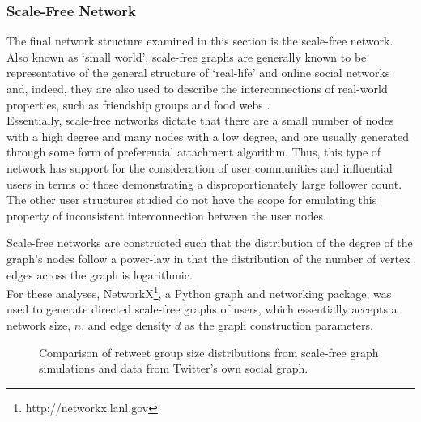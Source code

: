 \subsubsection{Scale-Free Network}
The final network structure examined in this section is the scale-free network. Also known as `small world', scale-free graphs are generally known to be representative of the general structure of `real-life' and online social networks \cite{mislove07} and, indeed, they are also used to describe the interconnections of real-world properties, such as friendship groups and food webs \cite{guido07} \cite{hein06}.\\
Essentially, scale-free networks dictate that there are a small number of nodes with a high degree and many nodes with a low degree, and are usually generated through some form of preferential attachment algorithm. Thus, this type of network has support for the consideration of user communities and influential users in terms of those demonstrating a disproportionately large follower count. The other user structures studied do not have the scope for emulating this property of inconsistent interconnection between the user nodes.

Scale-free networks are constructed such that the distribution of the degree of the graph's nodes follow a power-law in that the distribution of the number of vertex edges across the graph is logarithmic.\\
For these analyses, NetworkX\footnote{http://networkx.lanl.gov}, a Python graph and networking package, was used to generate directed scale-free graphs of users, which essentially accepts a network size, $n$, and edge density $d$ as the graph construction parameters. 

\begin{figure}[h]
\centering
{}
\caption{Comparison of retweet group size distributions from scale-free graph simulations and data from Twitter's own social graph.}
\label{fig:real-scalefree}
\end{figure}

